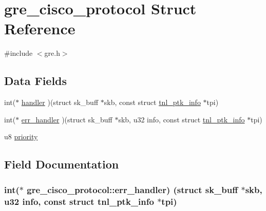 \hypertarget{structgre__cisco__protocol}{}\section{gre\+\_\+cisco\+\_\+protocol Struct Reference}
\label{structgre__cisco__protocol}


{\ttfamily \#include $<$gre.\+h$>$}

\subsection*{Data Fields}
\begin{DoxyCompactItemize}
\item 
int($\ast$ \hyperlink{structgre__cisco__protocol_a8722aaef2209a2681ed04072b9f0f38b}{handler} )(struct sk\+\_\+buff $\ast$skb, const struct \hyperlink{structtnl__ptk__info}{tnl\+\_\+ptk\+\_\+info} $\ast$tpi)
\item 
int($\ast$ \hyperlink{structgre__cisco__protocol_a16acc645da0209063b8108fc34b3b861}{err\+\_\+handler} )(struct sk\+\_\+buff $\ast$skb, u32 info, const struct \hyperlink{structtnl__ptk__info}{tnl\+\_\+ptk\+\_\+info} $\ast$tpi)
\item 
u8 \hyperlink{structgre__cisco__protocol_a3617a7910af354dccd32e3eb24794975}{priority}
\end{DoxyCompactItemize}


\subsection{Field Documentation}
\hypertarget{structgre__cisco__protocol_a16acc645da0209063b8108fc34b3b861}{}
\subsubsection[{err\+\_\+handler}]{\setlength{\rightskip}{0pt plus 5cm}int($\ast$ gre\+\_\+cisco\+\_\+protocol\+::err\+\_\+handler) (struct sk\+\_\+buff $\ast$skb, u32 info, const struct {\bf tnl\+\_\+ptk\+\_\+info} $\ast$tpi)}\label{structgre__cisco__protocol_a16acc645da0209063b8108fc34b3b861}
\hypertarget{structgre__cisco__protocol_a8722aaef2209a2681ed04072b9f0f38b}{}
